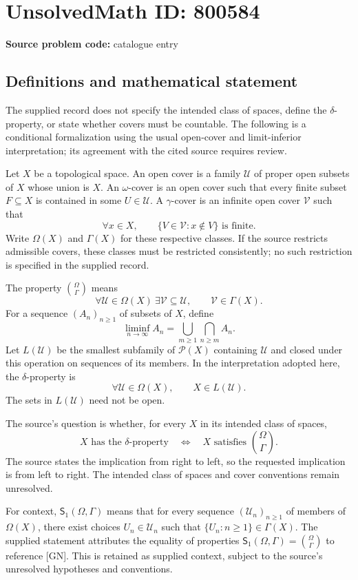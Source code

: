 \documentclass[11pt]{article}
\begin{document}
\section*{UnsolvedMath ID: 800584}
\textbf{Source problem code:} catalogue entry
\subsection{Definitions and mathematical statement}
The supplied record does not specify the intended class of spaces, define the \(\delta\)-property, or state whether covers must be countable. The following is a conditional formalization using the usual open-cover and limit-inferior interpretation; its agreement with the cited source requires review.

Let \(X\) be a topological space. An open cover is a family \(\mathcal U\) of proper open subsets of \(X\) whose union is \(X\). An \(\omega\)-cover is an open cover such that every finite subset \(F\subseteq X\) is contained in some \(U\in\mathcal U\). A \(\gamma\)-cover is an infinite open cover \(\mathcal V\) such that
\[
\forall x\in X,\qquad \{V\in\mathcal V:x\notin V\}\text{ is finite}.
\]
Write \(\Omega(X)\) and \(\Gamma(X)\) for these respective classes. If the source restricts admissible covers, these classes must be restricted consistently; no such restriction is specified in the supplied record.

The property \(\binom{\Omega}{\Gamma}\) means
\[
\forall\mathcal U\in\Omega(X)\ \exists\mathcal V\subseteq\mathcal U,
\qquad \mathcal V\in\Gamma(X).
\]
For a sequence \((A_n)_{n\geq1}\) of subsets of \(X\), define
\[
\liminf_{n\to\infty}A_n
=\bigcup_{m\geq1}\bigcap_{n\geq m}A_n.
\]
Let \(L(\mathcal U)\) be the smallest subfamily of \(\mathcal P(X)\) containing \(\mathcal U\) and closed under this operation on sequences of its members. In the interpretation adopted here, the \(\delta\)-property is
\[
\forall\mathcal U\in\Omega(X),\qquad X\in L(\mathcal U).
\]
The sets in \(L(\mathcal U)\) need not be open.

The source's question is whether, for every \(X\) in its intended class of spaces,
\[
X\text{ has the }\delta\text{-property}
\quad\Longleftrightarrow\quad
X\text{ satisfies }\binom{\Omega}{\Gamma}.
\]
The source states the implication from right to left, so the requested implication is from left to right. The intended class of spaces and cover conventions remain unresolved.

For context, \(\mathsf S_1(\Omega,\Gamma)\) means that for every sequence \((\mathcal U_n)_{n\geq1}\) of members of \(\Omega(X)\), there exist choices \(U_n\in\mathcal U_n\) such that \(\{U_n:n\geq1\}\in\Gamma(X)\). The supplied statement attributes the equality of properties \(\mathsf S_1(\Omega,\Gamma)=\binom{\Omega}{\Gamma}\) to reference [GN]. This is retained as supplied context, subject to the source's unresolved hypotheses and conventions.
\end{document}
